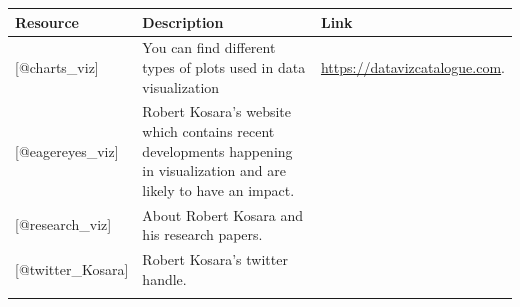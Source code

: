 \documentclass[]{book}
\theoremstyle{definition}
\theoremstyle{definition}
\theoremstyle{definition}
\theoremstyle{remark}
\begin{document}
\begin{longtable}[]{@{}lll@{}}
\toprule
\begin{minipage}[b]{0.15\columnwidth}\raggedright\strut
\textbf{Resource}\strut
\end{minipage} & \begin{minipage}[b]{0.28\columnwidth}\raggedright\strut
\textbf{Description}\strut
\end{minipage} & \begin{minipage}[b]{0.48\columnwidth}\raggedright\strut
\textbf{Link}\strut
\end{minipage}\tabularnewline
\midrule
\endhead
\begin{minipage}[t]{0.15\columnwidth}\raggedright\strut
{[}@charts\_viz{]}\strut
\end{minipage} & \begin{minipage}[t]{0.28\columnwidth}\raggedright\strut
You can find different types of plots used in data visualization\strut
\end{minipage} & \begin{minipage}[t]{0.48\columnwidth}\raggedright\strut
\href{https://datavizcatalogue.com/search.html}{https://datavizcatalogue.com}.\strut
\end{minipage}\tabularnewline
\begin{minipage}[t]{0.15\columnwidth}\raggedright\strut
{[}@eagereyes\_viz{]}\strut
\end{minipage} & \begin{minipage}[t]{0.28\columnwidth}\raggedright\strut
Robert Kosara's website which contains recent developments happening in
visualization and are likely to have an impact.\strut
\end{minipage}\tabularnewline
\begin{minipage}[t]{0.15\columnwidth}\raggedright\strut
{[}@research\_viz{]}\strut
\end{minipage} & \begin{minipage}[t]{0.28\columnwidth}\raggedright\strut
About Robert Kosara and his research papers.\strut
\end{minipage}\tabularnewline
\begin{minipage}[t]{0.15\columnwidth}\raggedright\strut
{[}@twitter\_Kosara{]}\strut
\end{minipage} & \begin{minipage}[t]{0.28\columnwidth}\raggedright\strut
Robert Kosara's twitter handle.\strut
\end{minipage}\tabularnewline
\begin{minipage}[t]{0.15\columnwidth}\raggedright\strut

\end{minipage}
\end{longtable}
\end{document}
